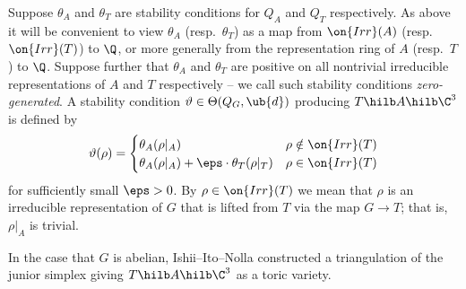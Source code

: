 \documentclass[leqno,11pt,a4paper]{amsart}
\begin{document}
Suppose $\theta_A$ and $\theta_T$ are stability conditions for $Q_A$ and $Q_T$ respectively. As above it will be convenient to view $\theta_A$ (resp.~$\theta_T$) as a map from $\on{Irr}(A)$ (resp.~$\on{Irr}(T)$) to $\Q$, or more generally from the representation ring of $A$ (resp.~$T$) to $\Q$. Suppose further that $\theta_A$ and $\theta_T$ are positive on all nontrivial irreducible representations of $A$ and $T$ respectively -- we call such stability conditions \emph{zero-generated}. A stability condition $\vartheta\in\Theta(Q_G,\ub{d})$ producing $T\hilb A\hilb\C^3$ is defined by
$$\vartheta(\rho)=\begin{cases}
\theta_A(\rho|_A) & \rho\notin\on{Irr}(T) \\
\theta_A(\rho|_A)+\eps\cdot\theta_T(\rho|_T) & \rho\in\on{Irr}(T)
\end{cases}$$
for sufficiently small $\eps>0$. By $\rho\in\on{Irr}(T)$ we mean that $\rho$ is an irreducible representation of $G$ that is lifted from $T$ via the map $G\to T$; that is, $\rho|_A$ is trivial.

In the case that $G$ is abelian, Ishii--Ito--Nolla \cite[\S4.1]{iin_gnh_13} constructed a triangulation of the junior simplex giving $T\hilb A\hilb\C^3$ as a toric variety.
\end{document}
